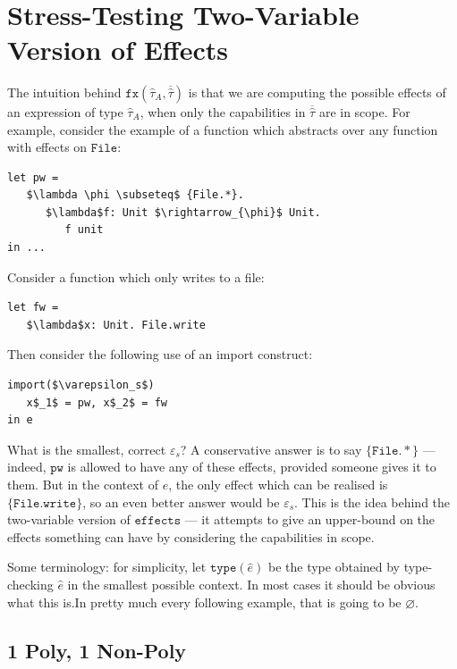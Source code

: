 \documentclass{llncs}
\newcommand{\keywadj}[1]{\mathtt{#1}}
\newcommand{\kwa}[1]{\keywadj{ #1 }}
\begin{document}
~\\

\section{Stress-Testing Two-Variable Version of Effects}

The intuition behind $\kwa{fx}(\hat \tau_A, \overline{\hat \tau})$ is that we are computing the possible effects of an expression of type $\hat \tau_A$, when only the capabilities in $\overline{\hat \tau}$ are in scope. For example, consider the example of a function which abstracts over any function with effects on $\kwa{File}$:

\begin{lstlisting}
let pw =
   $\lambda \phi \subseteq$ {File.*}.
      $\lambda$f: Unit $\rightarrow_{\phi}$ Unit.
         f unit
in ...
\end{lstlisting}

Consider a function which only writes to a file:

\begin{lstlisting}
let fw =
   $\lambda$x: Unit. File.write
\end{lstlisting}

Then consider the following use of an import construct:

\begin{lstlisting}
import($\varepsilon_s$)
   x$_1$ = pw, x$_2$ = fw
in e
\end{lstlisting}

What is the smallest, correct $\varepsilon_s$? A conservative answer is to say $\{ \kwa{File.*} \}$ --- indeed, $\kwa{pw}$ is allowed to have any of these effects, provided someone gives it to them. But in the context of $e$, the only effect which can be realised is $\{ \kwa{File.write} \}$, so an even better answer would be $\varepsilon_s$. This is the idea behind the two-variable version of $\kwa{effects}$ --- it attempts to give an upper-bound on the effects something can have by considering the capabilities in scope.

Some terminology: for simplicity, let $\kwa{type}(\hat e)$ be the type obtained by type-checking $\hat e$ in the smallest possible context. In most cases it should be obvious what this is.In pretty much every following example, that is going to be $\varnothing$.

\subsection{1 Poly, 1 Non-Poly}
\end{document}
